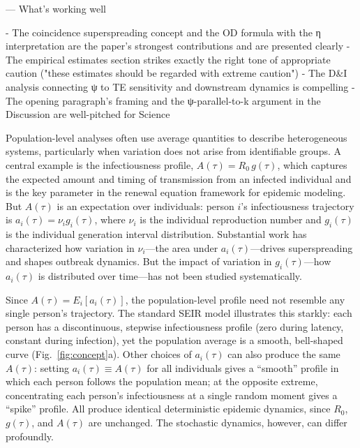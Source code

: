   ---
  What's working well

  - The coincidence superspreading concept and the OD formula with the η interpretation
   are the paper's strongest contributions and are presented clearly
  - The empirical estimates section strikes exactly the right tone of appropriate
  caution ("these estimates should be regarded with extreme caution")
  - The D&I analysis connecting ψ to TE sensitivity and downstream dynamics is
  compelling
  - The opening paragraph's framing and the ψ-parallel-to-k argument in the Discussion
  are well-pitched for Science















Population-level analyses often use average quantities to describe heterogeneous systems, particularly when variation does not arise from identifiable groups\citep{lloyd-smith_superspreading_2005}. A central example is the infectiousness profile, $A(\tau) = R_0 \, g(\tau)$, which captures the expected amount and timing of transmission from an infected individual and is the key parameter in the renewal equation framework for epidemic modeling\citep{wallinga_how_2007, breda_formulation_2012}. But $A(\tau)$ is an expectation over individuals: person $i$'s infectiousness trajectory is $a_i(\tau) = \nu_i g_i(\tau)$, where $\nu_i$ is the individual reproduction number and $g_i(\tau)$ is the individual generation interval distribution\citep{champredon_intrinsic_2015, svensson_note_2007}. Substantial work has characterized how variation in $\nu_i$---the area under $a_i(\tau)$---drives superspreading and shapes outbreak dynamics\citep{lloyd-smith_superspreading_2005}. But the impact of variation in $g_i(\tau)$---how $a_i(\tau)$ is distributed over time---has not been studied systematically.

Since $A(\tau) = E_i[a_i(\tau)]$, the population-level profile need not resemble any single person's trajectory. The standard SEIR model illustrates this starkly: each person has a discontinuous, stepwise infectiousness profile (zero during latency, constant during infection), yet the population average is a smooth, bell-shaped curve (Fig.~\ref{fig:concept}a). Other choices of $a_i(\tau)$ can also produce the same $A(\tau)$: setting $a_i(\tau) \equiv A(\tau)$ for all individuals gives a ``smooth'' profile in which each person follows the population mean; at the opposite extreme, concentrating each person's infectiousness at a single random moment gives a ``spike'' profile. All produce identical deterministic epidemic dynamics, since $R_0$, $g(\tau)$, and $A(\tau)$ are unchanged. The stochastic dynamics, however, can differ profoundly.

